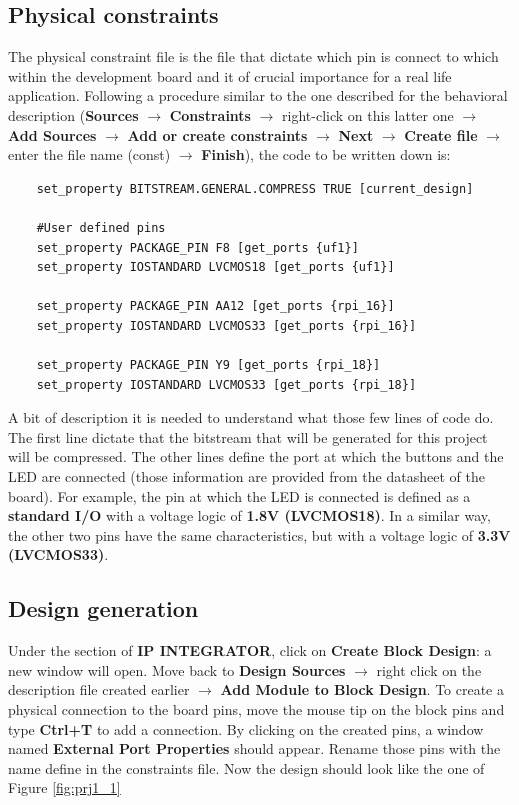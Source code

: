 \subsection{Physical constraints}
The physical constraint file is the file that dictate which pin is connect to which within the development board and it of crucial importance for a real life application. Following a procedure similar to the one described for the behavioral description (\textbf{Sources} $\rightarrow$ \textbf{Constraints} $\rightarrow$ right-click on this latter one $\rightarrow$ \textbf{Add Sources} $\rightarrow$ \textbf{Add or create constraints} $\rightarrow$ \textbf{Next} $\rightarrow$ \textbf{Create file} $\rightarrow$ enter the file name (const) $\rightarrow$ \textbf{Finish}), the code to be written down is:
\begin{verbatim}
	set_property BITSTREAM.GENERAL.COMPRESS TRUE [current_design]
	
	#User defined pins
	set_property PACKAGE_PIN F8 [get_ports {uf1}]
	set_property IOSTANDARD LVCMOS18 [get_ports {uf1}]
	
	set_property PACKAGE_PIN AA12 [get_ports {rpi_16}]
	set_property IOSTANDARD LVCMOS33 [get_ports {rpi_16}]
	
	set_property PACKAGE_PIN Y9 [get_ports {rpi_18}]
	set_property IOSTANDARD LVCMOS33 [get_ports {rpi_18}]
\end{verbatim}
A bit of description it is needed to understand what those few lines of code do. The first line dictate that the bitstream that will be generated for this project will be compressed. The other lines define the port at which the buttons and the LED are connected (those information are provided from the datasheet of the board). For example, the pin at which the LED is connected is defined as a \textbf{standard I/O} with a voltage logic of \textbf{1.8V (LVCMOS18)}. In a similar way, the other two pins have the same characteristics, but with a voltage logic of \textbf{3.3V (LVCMOS33)}.

\subsection{Design generation}
Under the section of \textbf{IP INTEGRATOR}, click on \textbf{Create Block Design}: a new window will open. Move back to \textbf{Design Sources} $\rightarrow$ right click on the description file created earlier $\rightarrow$ \textbf{Add Module to Block Design}. To create a physical connection to the board pins, move the mouse tip on the block pins and type \textbf{Ctrl+T} to add a connection. By clicking on the created pins, a window named \textbf{External Port Properties} should appear. Rename those pins with the name define in the constraints file. Now the design should look like the one of Figure \ref{fig:prj1_1}

